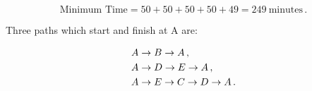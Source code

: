 \begin{subquestions}
\begin{subsubquestions}
\begin{equation}
	\text{Minimum Time} = 50+50+50+50+49 = 249 ~\text{minutes}\,.
\end{equation}

\end{subsubquestions}


\subquestion

Three paths which start and finish at A are:

\begin{align}
	& A \rightarrow B \rightarrow A \,, \nonumber \\
	& A \rightarrow D \rightarrow E \rightarrow A \,, \nonumber \\
	& A \rightarrow E \rightarrow C \rightarrow D \rightarrow A \,.
\end{align}

\end{subquestions}

